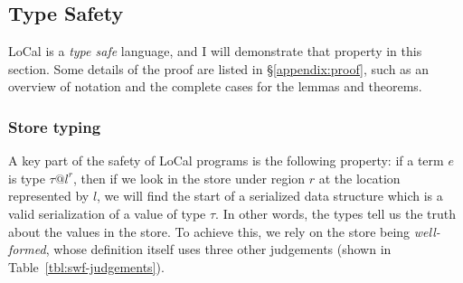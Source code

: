 \documentclass[showabstract,showacknowledgments,showpreface,showdedication,school]{iuphd}
\makeatletter
\theoremstyle{nonumberplain}
\newcommand{\sysname}[0]{LoCal\xspace}
\newcommand{\ourcalc}[0]{\sysname}
\newcommand{\keywd}[1]{\mathit{#1}}
\newcommand{\skeywd}[1]{\mathit{#1}}
\newcommand{\TYP}{\keywd{\tau}}
\newcommand{\loc}{\skeywd{l}}
\newcommand{\reg}{\skeywd{r}}
\newcommand{\locreg}[2]{\ensuremath{{#1}^{#2}}}
\newcommand{\tyatlocreg}[3]{#1 \ensuremath{@} \locreg{#2}{#3}}
\newcommand{\secref}[1]{\S\ref{#1}}
\makeatother
\begin{document}
\subsection{Type Safety}
\label{subsec:typesafety}


\ourcalc{} is a \emph{type safe} language, and I will demonstrate that property
in this section. Some details of the proof are listed in \secref{appendix:proof},
such as an overview of notation and the complete cases for the lemmas and theorems.










\subsubsection{Store typing}
\label{sec:well-formedness}
A key part of the safety of \ourcalc{} programs is the following property: if a
term $e$ is type $\tyatlocreg{\TYP}{\loc}{\reg}$, then if we look in the store
under region $\reg$ at the location represented by $\loc$, we will find the
start of a serialized data structure which is a valid serialization of a value
of type $\TYP$. In other words, the types tell us the truth about the values in
the store.
To achieve this, we rely on the store being \emph{well-formed}, whose definition
itself uses three other judgements (shown in Table~\ref{tbl:swf-judgements}).
\end{document}
